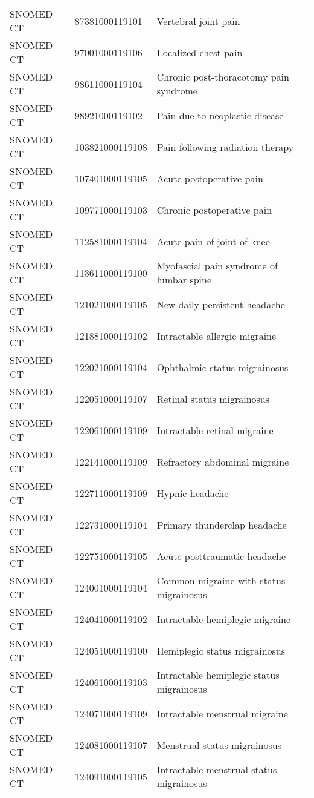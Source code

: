 \begin{longtable}{p{}p{}p{}}
  SNOMED CT & 87381000119101 & Vertebral joint pain \\ 
  SNOMED CT & 97001000119106 & Localized chest pain \\ 
  SNOMED CT & 98611000119104 & Chronic post-thoracotomy pain syndrome \\ 
  SNOMED CT & 98921000119102 & Pain due to neoplastic disease \\ 
  SNOMED CT & 103821000119108 & Pain following radiation therapy \\ 
  SNOMED CT & 107401000119105 & Acute postoperative pain \\ 
  SNOMED CT & 109771000119103 & Chronic postoperative pain \\ 
  SNOMED CT & 112581000119104 & Acute pain of joint of knee \\ 
  SNOMED CT & 113611000119100 & Myofascial pain syndrome of lumbar spine \\ 
  SNOMED CT & 121021000119105 & New daily persistent headache \\ 
  SNOMED CT & 121881000119102 & Intractable allergic migraine \\ 
  SNOMED CT & 122021000119104 & Ophthalmic status migrainosus \\ 
  SNOMED CT & 122051000119107 & Retinal status migrainosus \\ 
  SNOMED CT & 122061000119109 & Intractable retinal migraine \\ 
  SNOMED CT & 122141000119109 & Refractory abdominal migraine \\ 
  SNOMED CT & 122711000119109 & Hypnic headache \\ 
  SNOMED CT & 122731000119104 & Primary thunderclap headache \\ 
  SNOMED CT & 122751000119105 & Acute posttraumatic headache \\ 
  SNOMED CT & 124001000119104 & Common migraine with status migrainosus \\ 
  SNOMED CT & 124041000119102 & Intractable hemiplegic migraine \\ 
  SNOMED CT & 124051000119100 & Hemiplegic status migrainosus \\ 
  SNOMED CT & 124061000119103 & Intractable hemiplegic status migrainosus \\ 
  SNOMED CT & 124071000119109 & Intractable menstrual migraine \\ 
  SNOMED CT & 124081000119107 & Menstrual status migrainosus \\ 
  SNOMED CT & 124091000119105 & Intractable menstrual status migrainosus \\ 

\end{longtable}
